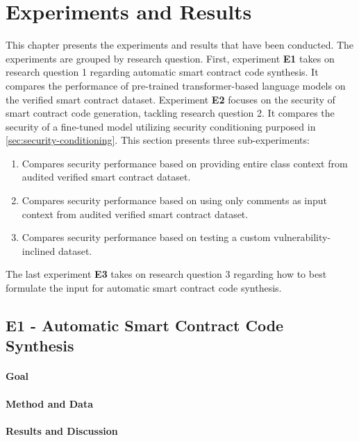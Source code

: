 
\chapter{Experiments and Results}
\label{chap:experiments-and-results}
This chapter presents the experiments and results that have been conducted. The experiments are grouped by research question. First, experiment \textbf{E1} takes on research question 1 regarding automatic smart contract code synthesis. It compares the performance of pre-trained transformer-based language models on the verified smart contract dataset. Experiment \textbf{E2} focuses on the security of smart contract code generation, tackling research question 2. It compares the security of a fine-tuned model utilizing security conditioning purposed in \cref{sec:security-conditioning}. This section presents three sub-experiments:
\begin{enumerate}[label=\textbf{E2.\arabic*.}, leftmargin=1.5cm]
    \item Compares security performance based on providing entire class context from audited verified smart contract dataset.
    \item Compares security performance based on using only comments as input context from audited verified smart contract dataset.
    \item Compares security performance based on testing a custom vulnerability-inclined dataset.
\end{enumerate}

The last experiment \textbf{E3} takes on research question 3 regarding how to best formulate the input for automatic smart contract code synthesis.

\section{E1 - Automatic Smart Contract Code Synthesis}
\label{sec:e1-automatic-smart-contract-code-synthesis}

\subsubsection{Goal}
\subsubsection{Method and Data}
\subsubsection{Results and Discussion}

